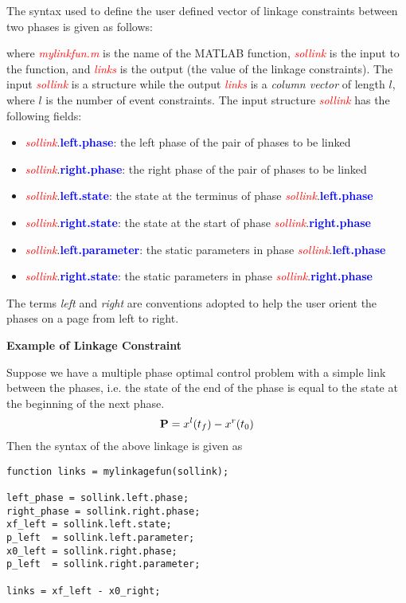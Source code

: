 \documentclass[10pt,final]{report}
\newenvironment{shadedframe}{%
  \def\FrameCommand{\fcolorbox{black}{shadecolor}}%
  \MakeFramed {\FrameRestore}}
{\endMakeFramed}
\newcommand{\bfblue}[1]{\textcolor{blue}{\bf #1}}
\newcommand{\slred}[1]{\textcolor{red}{\sl #1}}
\begin{document}
The syntax used to define the user defined vector of linkage
constraints between two phases is given as follows:
\begin{center}
\end{center}
{\noindent}where \slred{mylinkfun.m} is the name of the MATLAB function,
\slred{sollink} is the input to the function, and \slred{links} is the output (\ie the value of the linkage
constraints).  The input \slred{sollink} is a structure while the output \slred{links} is a {\em column vector} of length $l$,
where $l$ is the number of event constraints. The input structure \slred{sollink} has the following fields:
\begin{itemize}
  \item \slred{sollink}.\bfblue{left.phase}:  the left phase of the
    pair of phases to be linked
  \item \slred{sollink}.\bfblue{right.phase}:  the right phase of the pair of phases to be linked
  \item \slred{sollink}.\bfblue{left.state}: the state at the terminus of phase \slred{sollink}.\bfblue{left.phase}
  \item \slred{sollink}.\bfblue{right.state}: the state at the start of phase \slred{sollink}.\bfblue{right.phase}
  \item \slred{sollink}.\bfblue{left.parameter}: the static parameters in phase \slred{sollink}.\bfblue{left.phase}
  \item \slred{sollink}.\bfblue{right.state}: the static parameters in phase \slred{sollink}.\bfblue{right.phase}
\end{itemize}
The terms {\em left} and {\em right} are conventions adopted to help
the user orient the phases on a page from left to right.

\begin{shadedframe}
{\noindent}{\bf Example of Linkage Constraint}
\vspace{12pt}

{\noindent}Suppose we have a multiple phase optimal control problem with a simple link between the phases, i.e. the state of the end of the phase is equal to the state at the beginning of the next phase.  \begin{displaymath}
\mathbf{P} = x^l(t_f) - x^r(t_0)
\end{displaymath}
Then the syntax of the above linkage is given as
\begin{verbatim}
function links = mylinkagefun(sollink);

left_phase = sollink.left.phase;
right_phase = sollink.right.phase;
xf_left = sollink.left.state;
p_left  = sollink.left.parameter;
x0_left = sollink.right.phase;
p_left  = sollink.right.parameter;

links = xf_left - x0_right;
\end{verbatim}
\end{shadedframe}
\end{document}
